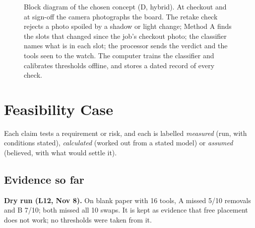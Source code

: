 \begin{figure}[!t]
\caption{Block diagram of the chosen concept (D, hybrid). At checkout and
at sign-off the camera photographs the board. The retake check rejects a
photo spoiled by a shadow or light change; Method A finds the slots that
changed since the job's checkout photo; the classifier names what is in
each slot; the processor sends the verdict and the tools seen to the watch.
The computer trains the classifier and calibrates thresholds offline, and
stores a dated record of every check.}
\label{fig:block}
\end{figure}

\section{Feasibility Case}
Each claim tests a requirement or risk, and each is labelled
\emph{measured} (run, with conditions stated), \emph{calculated} (worked out
from a stated model) or \emph{assumed} (believed, with what would settle it).

\subsection{Evidence so far}
\textbf{Dry run (L12, Nov 8).} On blank paper with 16 tools, A missed 5/10
removals and B 7/10; both missed all 10 swaps. It is kept as evidence that
free placement does not work; no thresholds were taken from it.

